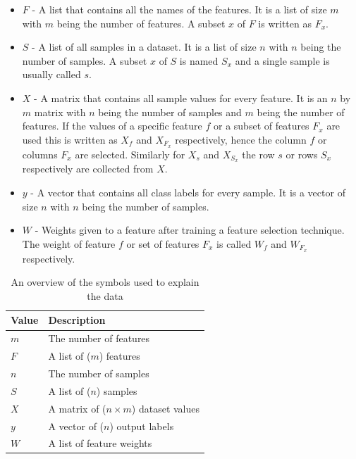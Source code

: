 \documentclass[10pt,a4paper]{report}
\begin{document}
	\begin{itemize}
		\item \textit{$F$} -
		A list that contains all the names of the features. It is a list of size $m$ with $m$ being the number of features. A subset $x$ of $F$ is written as $F_x$.
		\item \textit{$S$} -  
		A list of all samples in a dataset. It is a list of size $n$ with $n$ being the number of samples. A subset $x$ of $S$ is named $S_x$ and a single sample is usually called $s$. 
		\item \textit{$X$} -
		A matrix that contains all sample values for every feature. It is an $n$ by $m$ matrix with $n$ being the number of samples and $m$ being the number of features. If the values of a specific feature $f$ or a subset of features $F_x$ are used this is written as $X_f$ and $X_{F_x}$ respectively, hence the column $f$ or columns $F_x$ are selected. Similarly for $X_s$ and $X_{S_x}$ the row $s$ or rows $S_x$ respectively are collected from $X$.
		\item \textit{$y$} -
		A vector that contains all class labels for every sample. It is a vector of size $n$ with $n$ being the number of samples.
		\item \textit{$W$} - 
		Weights given to a feature after training a feature selection technique. The weight of feature $f$ or set of features $F_x$ is called $W_f$ and $W_{F_x}$ respectively.
	\end{itemize}
	
	\begin{table}[]
		\caption{An overview of the symbols used to explain the data}
		\label{tab:DatasetSymbols}
		\begin{tabular}{|l|l|}
			\hline
			\textbf{Value} & \textbf{Description}                                   \\ \hline
			$m$				 & The number of features                                 \\ \hline
			$F$              & A list of ($m$) features                                 \\ \hline
			$n$				 & The number of samples                                 \\ \hline
			$S$              & A list of ($n$) samples                                  \\ \hline
			$X$              & A matrix of ($n \times m$) dataset values \\ \hline
			$y$              & A vector of ($n$) output labels                          \\ \hline
			$W$              & A list of feature weights                              \\ \hline
		\end{tabular}
	\end{table}
	
\end{document}
